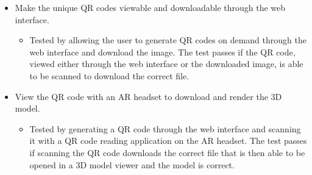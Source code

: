 \begin{itemize}
    \item Make the unique QR codes viewable and downloadable through the web interface.
    \begin{itemize}
        \item Tested by allowing the user to generate QR codes on demand through the web interface and download the image. The test passes if the QR code, viewed either through the web interface or the downloaded image, is able to be scanned to download the correct file.
    \end{itemize}    

    \item View the QR code with an AR headset to download and render the 3D model.
    \begin{itemize}
        \item Tested by generating a QR code through the web interface and scanning it with a QR code reading application on the AR headset. The test passes if scanning the QR code downloads the correct file that is then able to be opened in a 3D model viewer and the model is correct.
    \end{itemize}    
\end{itemize}
